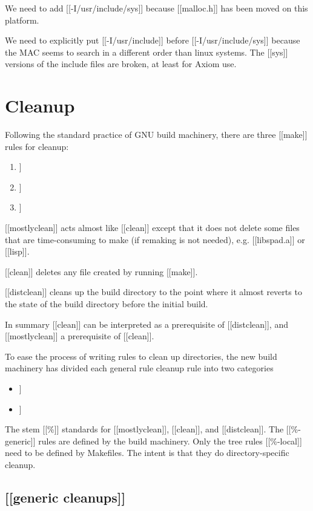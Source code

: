 \documentclass{article}
\begin{document}
We need to add [[-I/usr/include/sys]] because [[malloc.h]] has been
moved on this platform.

We need to explicitly put [[-I/usr/include]] before
[[-I/usr/include/sys]] because the MAC seems to search in a
different order than linux systems. The [[sys]] versions of
the include files are broken, at least for Axiom use.



\section{Cleanup}
Following the standard practice of GNU build machinery, there are
three [[make]] rules for cleanup:
\begin{enumerate}
\item [[mostlyclean]]
\item [[clean]]
\item [[distclean]]
\end{enumerate}

[[mostlyclean]] acts almost like [[clean]] except that it does not
delete some files that are time-consuming to make (if remaking is
not needed), e.g. [[libspad.a]] or [[lisp]].

[[clean]] deletes any file created by running [[make]].

[[distclean]] cleans up the build directory to the point where it almost
reverts to the state of the build directory before the initial build.

In summary [[clean]] can be interpreted as a prerequisite of [[distclean]],
and [[mostlyclean]] a prerequisite of [[clean]].


To ease the process of writing rules to clean up directories, the new
build machinery has divided each general rule cleanup rule into two
categories
\begin{itemize}
\item [[\%-generic]]
\item [[\%-local]]
\end{itemize}

The stem [[\%]] standards for [[mostlyclean]], [[clean]], and
[[distclean]].  The [[\%-generic]] rules are defined by the
build machinery.  Only the tree rules [[\%-local]] need to be defined
by Makefiles.  The intent is that they do directory-specific cleanup.



\subsection{[[generic cleanups]]}
\end{document}
